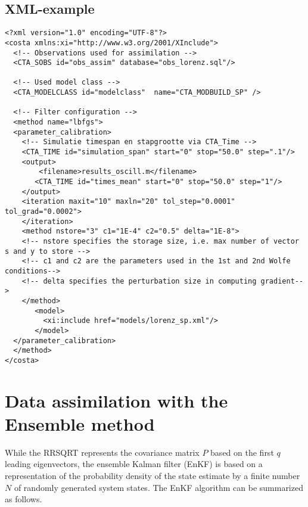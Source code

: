 \subsection{XML-example}

\begin{verbatim}
<?xml version="1.0" encoding="UTF-8"?>
<costa xmlns:xi="http://www.w3.org/2001/XInclude">
  <!-- Observations used for assimilation -->
  <CTA_SOBS id="obs_assim" database="obs_lorenz.sql"/>

  <!-- Used model class -->
  <CTA_MODELCLASS id="modelclass"  name="CTA_MODBUILD_SP" />

  <!-- Filter configuration -->
  <method name="lbfgs">
  <parameter_calibration>
    <!-- Simulatie timespan en stapgrootte via CTA_Time -->
    <CTA_TIME id="simulation_span" start="0" stop="50.0" step=".1"/>
    <output>
        <filename>results_oscill.m</filename> 
       <CTA_TIME id="times_mean" start="0" stop="50.0" step="1"/>
    </output>
    <iteration maxit="10" maxln="20" tol_step="0.0001" tol_grad="0.0002">
    </iteration>
    <method nstore="3" c1="1E-4" c2="0.5" delta="1E-8">
    <!-- nstore specifies the storage size, i.e. max number of vector s and y to store -->
    <!-- c1 and c2 are the parameters used in the 1st and 2nd Wolfe conditions-->
    <!-- delta specifies the perturbation size in computing gradient-->
    </method>
       <model>
         <xi:include href="models/lorenz_sp.xml"/>
       </model>
  </parameter_calibration>
  </method>
</costa>
\end{verbatim}


\section{Data assimilation  with the Ensemble method}

While the RRSQRT represents the covariance matrix $P$ based on the first $q$
leading eigenvectors, the ensemble Kalman filter (EnKF) is based on a
representation of the probability density of the state estimate by a finite
number $N$ of randomly generated system states. The EnKF algorithm can be
summarized as follows.

